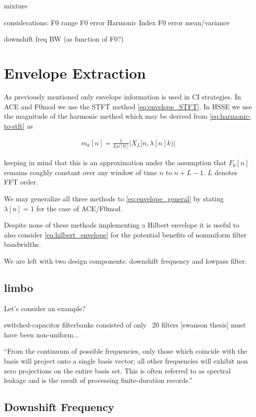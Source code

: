 \documentclass [11pt, proquest] {uwthesis}[2015/03/03]
\begin{document}
mixture %

considerations:
F0 range
F0 error
Harmonic Index
F0 error mean/variance

downshift freq
BW (as function of F0?)


\section{Envelope Extraction}

As previously mentioned only envelope information is used in CI strategies.  In ACE and F0mod we use the STFT method \ref{eq:envelope_STFT}.  In HSSE we use the magnitude of the harmonic method which may be derived from \ref{eq:harmonic-to-stft} as 

\begin{align}
\label{eq:envelope_general}
m_k[n] = \frac{1}{Lw[0]} \vert X_L[n, \lambda[n]k) \vert
\end{align}

keeping in mind that this is an approximation under the assumption that $F_0[n]$ remains roughly constant over any window of time $n$ to $n + L - 1$.  $L$ denotes FFT order.

We may generalize all three methods to \ref{eq:envelope_general} by stating $\lambda[n] = 1$ for the case of ACE/F0mod.

Despite none of these methods implementing a Hilbert envelope it is useful to also consider \ref{eq:hilbert_envelope} for the potential benefits of nonuniform filter bandwidths.

We are left with two design components: downshift frequency and lowpass filter.

\subsection{limbo}

Let's consider an example?

switched-capacitor filterbanks consisted of only ~20 filters [swanson thesis] must have been non-uniform...



``From the continuum of possible frequencies, only those which coincide with the basis will project onto a single basis vector; all other frequencies will exhibit non zero projections on the entire basis set. This is often referred to as spectral leakage and is the result of processing finite-duration records.''

\subsection{Downshift Frequency}
\end{document}
